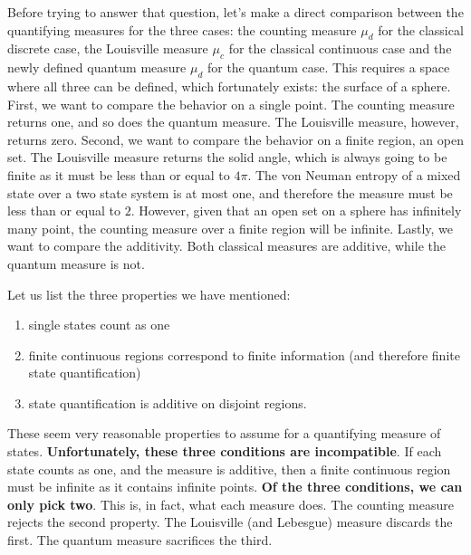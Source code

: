 \documentclass[10pt,twocolumn, nofootinbib]{revtex4-2}
\begin{document}
Before trying to answer that question, let's make a direct comparison between the quantifying measures for the three cases: the counting measure $\mu_d$ for the classical discrete case, the Louisville measure $\mu_c$ for the classical continuous case and the newly defined quantum measure $\mu_d$ for the quantum case. This requires a space where all three can be defined, which fortunately exists: the surface of a sphere. First, we want to compare the behavior on a single point. The counting measure returns one, and so does the quantum measure. The Louisville measure, however, returns zero. Second, we want to compare the behavior on a finite region, an open set. The Louisville measure returns the solid angle, which is always going to be finite as it must be less than or equal to $4\pi$. The von Neuman entropy of a mixed state over a two state system is at most one, and therefore the measure must be less than or equal to $2$. However, given that an open set on a sphere has infinitely many point, the counting measure over a finite region will be infinite. Lastly, we want to compare the additivity. Both classical measures are additive, while the quantum measure is not.

Let us list the three properties we have mentioned:
\begin{enumerate}
	\item single states count as one
	\item finite continuous regions correspond to finite information (and therefore finite state quantification)
	\item state quantification is additive on disjoint regions.
\end{enumerate}
These seem very reasonable properties to assume for a quantifying measure of states. \textbf{Unfortunately, these three conditions are incompatible}. If each state counts as one, and the measure is additive, then a finite continuous region must be infinite as it contains infinite points. \textbf{Of the three conditions, we can only pick two}. This is, in fact, what each measure does. The counting measure rejects the second property. The Louisville (and Lebesgue) measure discards the first. The quantum measure sacrifices the third.
\end{document}
